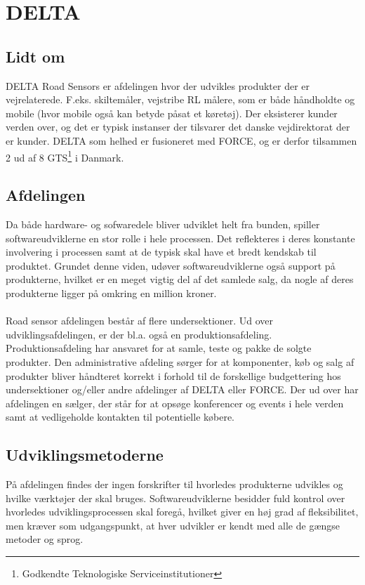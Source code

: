 \section{DELTA}

\subsection{Lidt om}
DELTA Road Sensors er afdelingen hvor der udvikles produkter der er vejrelaterede. F.eks. skiltemåler, vejstribe RL målere, som er både håndholdte og mobile (hvor mobile også kan betyde påsat et køretøj). Der eksisterer kunder verden over, og det er typisk instanser der tilsvarer det danske vejdirektorat der er kunder. DELTA som helhed er fusioneret med FORCE, og er derfor tilsammen 2 ud af 8 GTS\footnote{Godkendte Teknologiske Serviceinstitutioner} i Danmark.

\subsection{Afdelingen}
Da både hardware- og sofwaredele bliver udviklet helt fra bunden, spiller softwareudviklerne en stor rolle i hele processen. Det reflekteres i deres konstante involvering i processen samt at de typisk skal have et bredt kendskab til produktet. Grundet denne viden, udøver softwareudviklerne også support på produkterne, hvilket er en meget vigtig del af det samlede salg, da nogle af deres produkterne ligger på omkring en million kroner.\\
\\
Road sensor afdelingen består af flere undersektioner. Ud over udviklingsafdelingen, er der bl.a. også en produktionsafdeling. Produktionsafdeling har ansvaret for at samle, teste og pakke de solgte produkter. Den administrative afdeling sørger for at komponenter, køb og salg af produkter bliver håndteret korrekt i forhold til de forskellige budgettering hos undersektioner og/eller andre afdelinger af DELTA eller FORCE. Der ud over har afdelingen en sælger, der står for at opsøge konferencer og events i hele verden samt at vedligeholde kontakten til potentielle købere.

\subsection{Udviklingsmetoderne}
På afdelingen findes der ingen forskrifter til hvorledes produkterne udvikles og hvilke værktøjer der skal bruges. Softwareudviklerne besidder fuld kontrol over hvorledes udviklingsprocessen skal foregå, hvilket giver en høj grad af fleksibilitet, men kræver som udgangspunkt, at hver udvikler er kendt med alle de gængse metoder og sprog.

